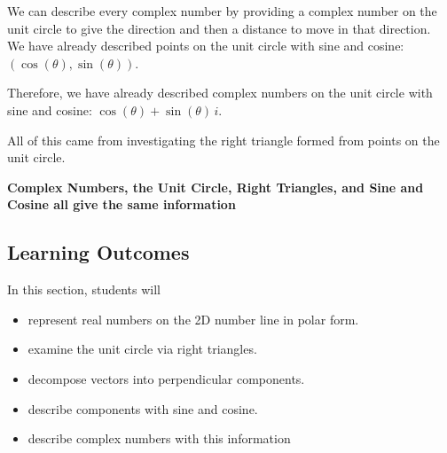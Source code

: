 \documentclass{ximera}
\begin{document}
We can describe every complex number by providing a complex number on the unit circle to give the direction and then a distance to move in that direction.  \\ 

We have already described points on the unit circle with sine and cosine: $(\cos(\theta), \sin(\theta))$. 

Therefore, we have already described complex numbers on the unit circle with sine and cosine: $\cos(\theta) + \sin(\theta) \, i$.  


All of this came from investigating the right triangle formed from points on the unit circle. \\



\begin{center}
\textbf{\textcolor{purple!85!blue}{Complex Numbers, the Unit Circle, Right Triangles, and Sine and Cosine all give the same information}}
\end{center}







\subsection*{Learning Outcomes}



\begin{sectionOutcomes}
In this section, students will 

\begin{itemize}
\item represent real numbers on the 2D number line in polar form.
\item examine the unit circle via right triangles.
\item decompose vectors into perpendicular components.
\item describe components with sine and cosine.
\item describe complex numbers with this information
\end{itemize}
\end{sectionOutcomes}














\end{document}
